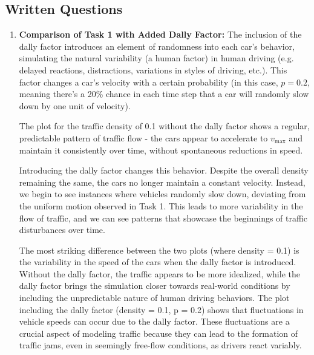 \documentclass{article}
\begin{document}
\subsection{Written Questions}
\begin{enumerate}
    \item 
    \textbf{Comparison of Task 1 with Added Dally Factor:} The inclusion of the dally factor introduces an element of randomness into each car's behavior, simulating the natural variability (a human factor) in human driving (e.g. delayed reactions, distractions, variations in styles of driving, etc.). This factor changes a car's velocity with a certain probability (in this case, $p = 0.2$, meaning there's a 20\% chance in each time step that a car will randomly slow down by one unit of velocity). 
    
    The plot for the traffic density of 0.1 without the dally factor shows a regular, predictable pattern of traffic flow - the cars appear to accelerate to $v_\text{max}$ and maintain it consistently over time, without spontaneous reductions in speed. 
    
    Introducing the dally factor changes this behavior. Despite the overall density remaining the same, the cars no longer maintain a constant velocity. Instead, we begin to see instances where vehicles randomly slow down, deviating from the uniform motion observed in Task 1. This leads to more variability in the flow of traffic, and we can see patterns that showcase the beginnings of traffic disturbances over time. 

    The most striking difference between the two plots (where density = 0.1) is the variability in the speed of the cars when the dally factor is introduced. Without the dally factor, the traffic appears to be more idealized, while the dally factor brings the simulation closer towards real-world conditions by including the unpredictable nature of human driving behaviors. The plot including the dally factor (density = 0.1, p = 0.2) shows that fluctuations in vehicle speeds can occur due to the dally factor. These fluctuations are a crucial aspect of modeling traffic because they can lead to the formation of traffic jams, even in seemingly free-flow conditions, as drivers react variably. 


\end{enumerate}
\end{document}
